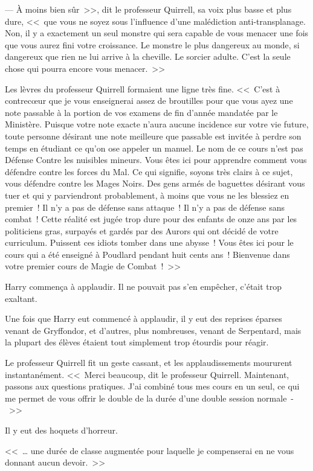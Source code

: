 --- À moins bien sûr~>>, dit le professeur Quirrell, sa voix plus basse et plus dure, <<~que vous ne soyez sous l'influence d'une malédiction anti-transplanage. Non, il y a exactement un seul monstre qui sera capable de vous menacer une fois que vous aurez fini votre croissance. Le monstre le plus dangereux au monde, si dangereux que rien ne lui arrive à la cheville. Le sorcier adulte. C'est la seule chose qui pourra encore vous menacer.~>>

Les lèvres du professeur Quirrell formaient une ligne très fine. <<~C'est à contrecœur que je vous enseignerai assez de broutilles pour que vous ayez une note passable à la portion de vos examens de fin d'année mandatée par le Ministère. Puisque votre note exacte n'aura aucune incidence sur votre vie future, toute personne désirant une note meilleure que passable est invitée à perdre son temps en étudiant ce qu'on ose appeler un manuel. Le nom de ce cours n'est pas Défense Contre les nuisibles mineurs. Vous êtes ici pour apprendre comment vous défendre contre les forces du Mal. Ce qui signifie, soyons très clairs à ce sujet, vous défendre contre les Mages Noirs. Des gens armés de baguettes désirant vous tuer et qui y parviendront probablement, à moins que vous ne les blessiez en premier~! Il n'y a pas de défense sans attaque~! Il n'y a pas de défense sans combat~! Cette réalité est jugée trop dure pour des enfants de onze ans par les politiciens gras, surpayés et gardés par des Aurors qui ont décidé de votre curriculum. Puissent ces idiots tomber dans une abysse~! Vous êtes ici pour le cours qui a été enseigné à Poudlard pendant huit cents ans~! Bienvenue dans votre premier cours de Magie de Combat~!~>>

Harry commença à applaudir. Il ne pouvait pas s'en empêcher, c'était trop exaltant.

Une fois que Harry eut commencé à applaudir, il y eut des reprises éparses venant de Gryffondor, et d'autres, plus nombreuses, venant de Serpentard, mais la plupart des élèves étaient tout simplement trop étourdis pour réagir.

Le professeur Quirrell fit un geste cassant, et les applaudissements moururent instantanément. <<~Merci beaucoup, dit le professeur Quirrell. Maintenant, passons aux questions pratiques. J'ai combiné tous mes cours en un seul, ce qui me permet de vous offrir le double de la durée d'une double session normale~-~>>

Il y eut des hoquets d'horreur.

<<~… une durée de classe augmentée pour laquelle je compenserai en ne vous donnant aucun devoir.~>>

